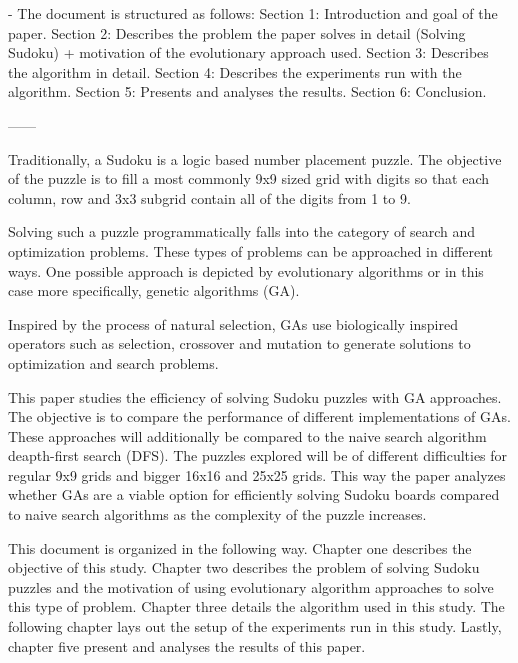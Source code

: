 - The document is structured as follows:
Section 1: Introduction and goal of the paper.
Section 2: Describes the problem the paper solves in detail (Solving Sudoku) + motivation of the evolutionary approach used.
Section 3: Describes the algorithm in detail.
Section 4: Describes the experiments run with the algorithm.
Section 5: Presents and analyses the results.
Section 6: Conclusion.

------
 
Traditionally, a Sudoku is a logic based number placement puzzle. The objective of the puzzle is to fill a most commonly 9x9 sized grid with digits so that each column, row and 3x3 subgrid contain all of the digits from 1 to 9.\cite{}

Solving such a puzzle programmatically falls into the category of search and optimization problems. These types of problems can be approached in different ways. One possible approach is depicted by evolutionary algorithms or in this case more specifically, genetic algorithms (GA)\cite{WikiSudoku}.

Inspired by the process of natural selection, GAs use biologically inspired operators such as selection, crossover and mutation to generate solutions to optimization and search problems\cite{WikiGA}.

This paper studies the efficiency of solving Sudoku puzzles with GA approaches. The objective is to compare the performance of different implementations of GAs. These approaches will additionally be compared to the naive search algorithm deapth-first search (DFS). The puzzles explored will be of different difficulties for regular 9x9 grids and bigger 16x16 and 25x25 grids. This way the paper analyzes whether GAs are a viable option for efficiently solving Sudoku boards compared to naive search algorithms as the complexity of the puzzle increases.

This document is organized in the following way. Chapter one describes the objective of this study. Chapter two describes the problem of solving Sudoku puzzles and the motivation of using evolutionary algorithm approaches to solve this type of problem. Chapter three details the algorithm used in this study. The following chapter lays out the setup of the experiments run in this study. Lastly, chapter five present and analyses the results of this paper.
